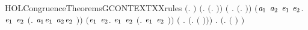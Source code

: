 \begin{SaveVerbatim}{HOLCongruenceTheoremsGCONTEXTXXrules}
\HOLTokenTurnstile{}  \ensuremath{(}\HOLTokenLambda{}. \ensuremath{)} \HOLSymConst{\HOLTokenConj{}} \ensuremath{(}\HOLSymConst{\HOLTokenForall{}}.  \ensuremath{(}\HOLTokenLambda{}. \ensuremath{)}\ensuremath{)} \HOLSymConst{\HOLTokenConj{}}
   \ensuremath{(}\HOLSymConst{\HOLTokenForall{}} .   \HOLSymConst{\HOLTokenImp{}}  \ensuremath{(}\HOLTokenLambda{}. \HOLSymConst{\ensuremath{\ldotp}} \ensuremath{)}\ensuremath{)} \HOLSymConst{\HOLTokenConj{}}
   \ensuremath{(}\HOLSymConst{\HOLTokenForall{}}\ensuremath{\HOLBoundVar{a}\sb{\mathrm{1}}} \ensuremath{\HOLBoundVar{a}\sb{\mathrm{2}}} \ensuremath{\HOLBoundVar{e}\sb{\mathrm{1}}} \ensuremath{\HOLBoundVar{e}\sb{\mathrm{2}}}.
         \ensuremath{\HOLBoundVar{e}\sb{\mathrm{1}}} \HOLSymConst{\HOLTokenConj{}}  \ensuremath{\HOLBoundVar{e}\sb{\mathrm{2}}} \HOLSymConst{\HOLTokenImp{}}
         \ensuremath{(}\HOLTokenLambda{}. \ensuremath{\HOLBoundVar{a}\sb{\mathrm{1}}}\HOLSymConst{\ensuremath{\ldotp}}\ensuremath{\HOLBoundVar{e}\sb{\mathrm{1}}}  \HOLSymConst{\ensuremath{+}} \ensuremath{\HOLBoundVar{a}\sb{\mathrm{2}}}\HOLSymConst{\ensuremath{\ldotp}}\ensuremath{\HOLBoundVar{e}\sb{\mathrm{2}}} \ensuremath{)}\ensuremath{)} \HOLSymConst{\HOLTokenConj{}}
   \ensuremath{(}\HOLSymConst{\HOLTokenForall{}}\ensuremath{\HOLBoundVar{e}\sb{\mathrm{1}}} \ensuremath{\HOLBoundVar{e}\sb{\mathrm{2}}}.
         \ensuremath{\HOLBoundVar{e}\sb{\mathrm{1}}} \HOLSymConst{\HOLTokenConj{}}  \ensuremath{\HOLBoundVar{e}\sb{\mathrm{2}}} \HOLSymConst{\HOLTokenImp{}}  \ensuremath{(}\HOLTokenLambda{}. \ensuremath{\HOLBoundVar{e}\sb{\mathrm{1}}}  \HOLSymConst{\ensuremath{\mid}} \ensuremath{\HOLBoundVar{e}\sb{\mathrm{2}}} \ensuremath{)}\ensuremath{)} \HOLSymConst{\HOLTokenConj{}}
   \ensuremath{(}\HOLSymConst{\HOLTokenForall{}} .   \HOLSymConst{\HOLTokenImp{}}  \ensuremath{(}\HOLTokenLambda{}.   \ensuremath{(} \ensuremath{)}\ensuremath{)}\ensuremath{)} \HOLSymConst{\HOLTokenConj{}}
   \HOLSymConst{\HOLTokenForall{}} .   \HOLSymConst{\HOLTokenImp{}}  \ensuremath{(}\HOLTokenLambda{}.  \ensuremath{(} \ensuremath{)} \ensuremath{)}
\end{SaveVerbatim}
